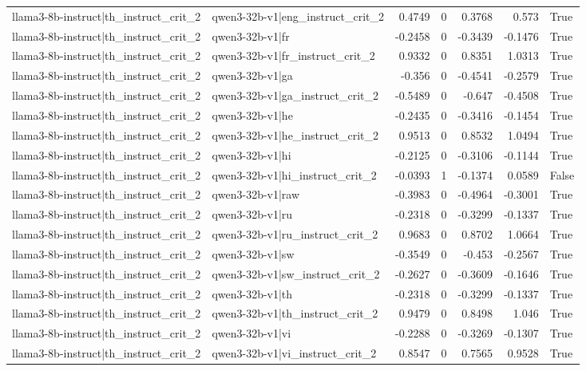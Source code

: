 \begin{table}
\begin{tabular}{l l r r r r l}
llama3-8b-instruct|th_instruct_crit_2 & qwen3-32b-v1|eng_instruct_crit_2 & 0.4749 & 0 & 0.3768 & 0.573 & True \\
llama3-8b-instruct|th_instruct_crit_2 & qwen3-32b-v1|fr & -0.2458 & 0 & -0.3439 & -0.1476 & True \\
llama3-8b-instruct|th_instruct_crit_2 & qwen3-32b-v1|fr_instruct_crit_2 & 0.9332 & 0 & 0.8351 & 1.0313 & True \\
llama3-8b-instruct|th_instruct_crit_2 & qwen3-32b-v1|ga & -0.356 & 0 & -0.4541 & -0.2579 & True \\
llama3-8b-instruct|th_instruct_crit_2 & qwen3-32b-v1|ga_instruct_crit_2 & -0.5489 & 0 & -0.647 & -0.4508 & True \\
llama3-8b-instruct|th_instruct_crit_2 & qwen3-32b-v1|he & -0.2435 & 0 & -0.3416 & -0.1454 & True \\
llama3-8b-instruct|th_instruct_crit_2 & qwen3-32b-v1|he_instruct_crit_2 & 0.9513 & 0 & 0.8532 & 1.0494 & True \\
llama3-8b-instruct|th_instruct_crit_2 & qwen3-32b-v1|hi & -0.2125 & 0 & -0.3106 & -0.1144 & True \\
llama3-8b-instruct|th_instruct_crit_2 & qwen3-32b-v1|hi_instruct_crit_2 & -0.0393 & 1 & -0.1374 & 0.0589 & False \\
llama3-8b-instruct|th_instruct_crit_2 & qwen3-32b-v1|raw & -0.3983 & 0 & -0.4964 & -0.3001 & True \\
llama3-8b-instruct|th_instruct_crit_2 & qwen3-32b-v1|ru & -0.2318 & 0 & -0.3299 & -0.1337 & True \\
llama3-8b-instruct|th_instruct_crit_2 & qwen3-32b-v1|ru_instruct_crit_2 & 0.9683 & 0 & 0.8702 & 1.0664 & True \\
llama3-8b-instruct|th_instruct_crit_2 & qwen3-32b-v1|sw & -0.3549 & 0 & -0.453 & -0.2567 & True \\
llama3-8b-instruct|th_instruct_crit_2 & qwen3-32b-v1|sw_instruct_crit_2 & -0.2627 & 0 & -0.3609 & -0.1646 & True \\
llama3-8b-instruct|th_instruct_crit_2 & qwen3-32b-v1|th & -0.2318 & 0 & -0.3299 & -0.1337 & True \\
llama3-8b-instruct|th_instruct_crit_2 & qwen3-32b-v1|th_instruct_crit_2 & 0.9479 & 0 & 0.8498 & 1.046 & True \\
llama3-8b-instruct|th_instruct_crit_2 & qwen3-32b-v1|vi & -0.2288 & 0 & -0.3269 & -0.1307 & True \\
llama3-8b-instruct|th_instruct_crit_2 & qwen3-32b-v1|vi_instruct_crit_2 & 0.8547 & 0 & 0.7565 & 0.9528 & True \\

\end{tabular}
\end{table}
